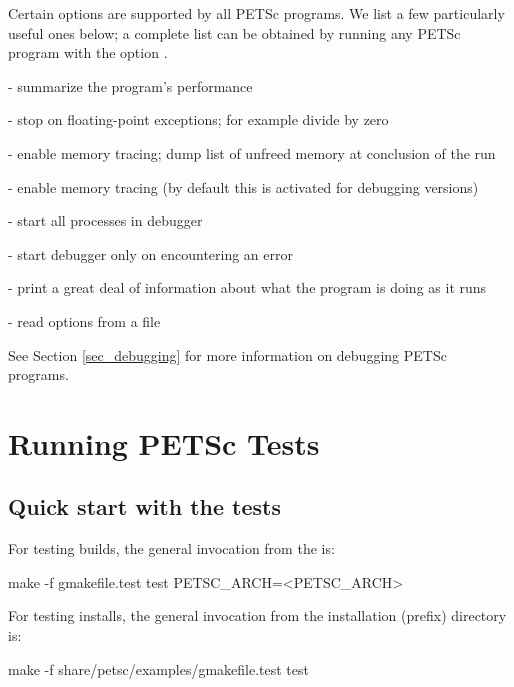 Certain options are supported by all PETSc programs.  We list a few
particularly useful ones below; a complete list can be obtained by
running any PETSc program with the option .
\begin{tightitemize}
\item {} - summarize the program's performance
\item {} - stop on floating-point exceptions; 
      for example divide by zero
\item {} - enable memory tracing; dump list of unfreed memory
      at conclusion  of the run
\item {} - enable memory tracing (by default this is
      activated for debugging versions)
\item {}  
     - start all processes in debugger  
\item {}  
       - start debugger only on encountering an error
\item {} - print a great deal of information about what the program is doing as it runs
\item {}  - read options from a file
\end{tightitemize}
See Section \ref{sec_debugging} for more information on debugging PETSc programs.


\section{Running PETSc Tests}
\label{sec_runningtests}

\subsection{Quick start with the tests}

For testing builds, the general invocation from the  is:
\begin{bashlisting}
make -f gmakefile.test test PETSC_ARCH=<PETSC_ARCH>
\end{bashlisting}

For testing installs, the general invocation from the installation (prefix)
directory is:
\begin{bashlisting}
make -f share/petsc/examples/gmakefile.test test
\end{bashlisting}

